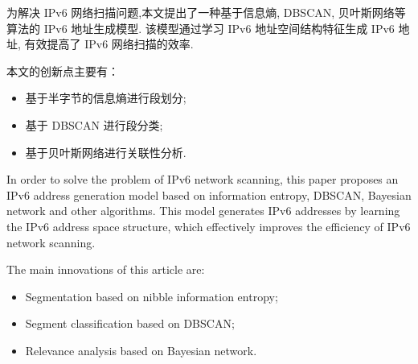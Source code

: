 \begin{cabstract}

  为解决 IPv6 网络扫描问题,本文提出了一种基于信息熵, DBSCAN, 贝叶斯网络等算法的 IPv6 地址生成模型. 该模型通过学习 IPv6 地址空间结构特征生成 IPv6 地址, 有效提高了 IPv6 网络扫描的效率.

  本文的创新点主要有：

  \begin{itemize}
  \item 基于半字节的信息熵进行段划分;
  \item 基于 DBSCAN 进行段分类;
  \item 基于贝叶斯网络进行关联性分析.
  \end{itemize}

\end{cabstract}


\begin{eabstract}

  In order to solve the problem of IPv6 network scanning, this paper proposes an IPv6 address generation model based on information entropy, DBSCAN, Bayesian network and other algorithms. This model generates IPv6 addresses by learning the IPv6 address space structure, which effectively improves the efficiency of IPv6 network scanning.

  The main innovations of this article are:

  \begin{itemize}
  \item Segmentation based on nibble information entropy;
  \item Segment classification based on DBSCAN;
  \item Relevance analysis based on Bayesian network.
  \end{itemize}

\end{eabstract}

